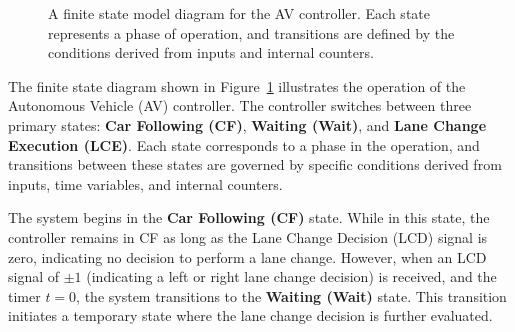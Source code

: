 \begin{figure}[htbp]
    \centering
    \caption{A finite state model diagram for the AV controller. Each state represents a phase of operation, and transitions are defined by the conditions derived from inputs and internal counters.}
    \label{fig:av_controller}
\end{figure}



The finite state diagram shown in Figure~\ref{fig:av_controller} illustrates the operation of the Autonomous Vehicle (AV) controller. The controller switches between three primary states: \textbf{Car Following (CF)}, \textbf{Waiting (Wait)}, and \textbf{Lane Change Execution (LCE)}. Each state corresponds to a phase in the operation, and transitions between these states are governed by specific conditions derived from inputs, time variables, and internal counters.

The system begins in the \textbf{Car Following (CF)} state. While in this state, the controller remains in CF as long as the Lane Change Decision (LCD) signal is zero, indicating no decision to perform a lane change. However, when an LCD signal of $\pm1$ (indicating a left or right lane change decision) is received, and the timer $t = 0$, the system transitions to the \textbf{Waiting (Wait)} state. This transition initiates a temporary state where the lane change decision is further evaluated.

